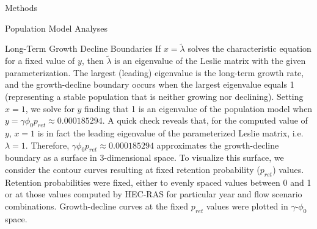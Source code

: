 \documentclass[12pt]{article}
\begin{document}
\begin{section}{Methods}
\begin{subsection}{Population Model Analyses}
\begin{subsubsection}{Long-Term Growth Decline Boundaries}
If $x=\tilde{\lambda}$ solves the characteristic equation for a fixed value of $y$, then $\tilde{\lambda}$ is an eigenvalue of the Leslie matrix with the given parameterization.  The largest (leading) eigenvalue is the long-term growth rate, and the growth-decline boundary occurs when the largest eigenvalue equals 1 (representing a stable population that is neither growing nor declining).  Setting $x=1$, we solve for $y$ finding that 1 is an eigenvalue of the population model when 
$y=\gamma\phi_0p_{ret}\approx0.000185294$.  A quick check reveals that, for the computed value of $y$, %
$x=1$ is in fact the leading eigenvalue of the parameterized Leslie matrix, i.e. $\lambda=1$.  Therefore, %
$\gamma\phi_0p_{ret}\approx0.000185294$ approximates the growth-decline boundary as a surface in 3-dimensional space.  To visualize this surface, we consider the contour curves resulting at fixed retention probability ($p_{ret}$) values.  Retention probabilities were fixed, either to evenly spaced values between 0 and 1 or at those values computed by HEC-RAS for particular year and flow scenario combinations.  Growth-decline curves at the fixed $p_{ret}$ values were plotted in $\gamma$-$\phi_0$ space.    
\end{subsubsection}



\end{subsection}
\end{section}
\end{document}

